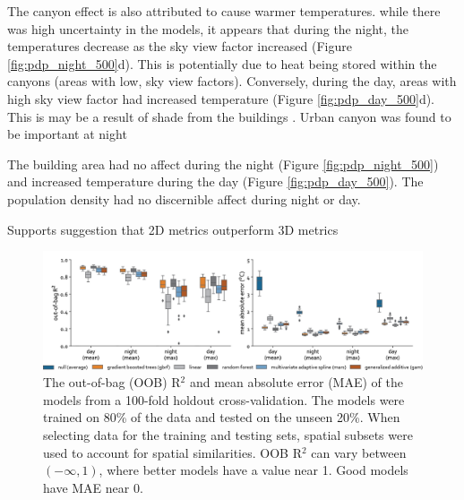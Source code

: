 \documentclass[final,3p,times,twocolumn,sort&compress]{elsarticle}
\begin{document}
The canyon effect is also attributed to cause warmer temperatures. \cite{Chun2017-mm,Oke1988-re}
while there was high uncertainty in the models, it appears that during the night, the temperatures decrease as the sky view factor increased (Figure \ref{fig:pdp_night_500}d).
This is potentially due to heat being stored within the canyons (areas with low, sky view factors).
Conversely, during the day, areas with high sky view factor had increased temperature (Figure \ref{fig:pdp_day_500}d).
This is may be a result of shade from the buildings \cite{Yu2019-ps}.
Urban canyon was found to be important at night \cite{Chun2017-mm}



The building area had no affect during the night (Figure \ref{fig:pdp_night_500}) and increased temperature during the day (Figure \ref{fig:pdp_day_500}).
The population density had no discernible affect during night or day.



Supports suggestion that 2D metrics outperform 3D metrics \cite{Berger2017-lx}


\begin{figure}
    \centering
    \includegraphics[width=\linewidth]{fig/report/holdout_500.png}
    \caption[Holdout cross-validation results at 500 meter resolution]{
    The out-of-bag (OOB) R$^2$ and mean absolute error (MAE) of the models from a 100-fold holdout cross-validation. 
    The models were trained on 80\% of the data and tested on the unseen 20\%.
    When selecting data for the training and testing sets, spatial subsets were used to account for spatial similarities. 
    OOB R$^2$ can vary between $(-\infty, 1)$, where better models have a value near 1. 
    Good models have MAE near 0.
    }
    \label{fig:holdout_500}
\end{figure}
\end{document}
